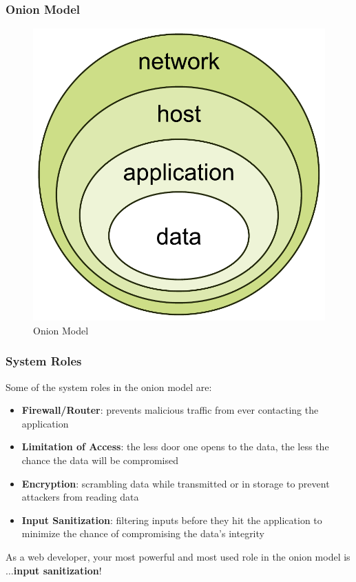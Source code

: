\documentclass[aspectratio=169]{beamer}
\begin{document}
\begin{frame}
\frametitle{Onion Model}
\begin{figure}
\includegraphics[scale=0.4]{../artifacts/onion.pdf}
\caption{Onion Model}
\label{fig:onion}
\end{figure}
\end{frame}

\begin{frame}
\frametitle{System Roles}
Some of the system roles in the onion model are:
\begin{itemize}
	\item \textbf{Firewall/Router}: prevents malicious traffic from ever contacting the application
	\item \textbf{Limitation of Access}: the less door one opens to the data, the less the chance the data will be compromised
	\item \textbf{Encryption}: scrambling data while transmitted or in storage to prevent attackers from reading data
	\item \textbf{Input Sanitization}: filtering inputs before they hit the application to minimize the chance of compromising the data's integrity
\end{itemize}
As a web developer, your most powerful and most used role in the onion model is$\dots$\pause\textbf{input sanitization}!
\end{frame}
\end{document}

